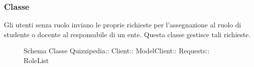 \subsubsection{Classe }
Gli utenti senza ruolo inviano le proprie richieste per l'assegnazione al ruolo di studente o docente al responsabile di un ente. Questa classe gestisce tali richieste.
\begin{figure}[H]
\centering
\noindent{}
\caption[Schema Classe RoleList]{Schema Classe Quizzipedia:: Client:: ModelClient:: Requests:: RoleList}
\end{figure}

